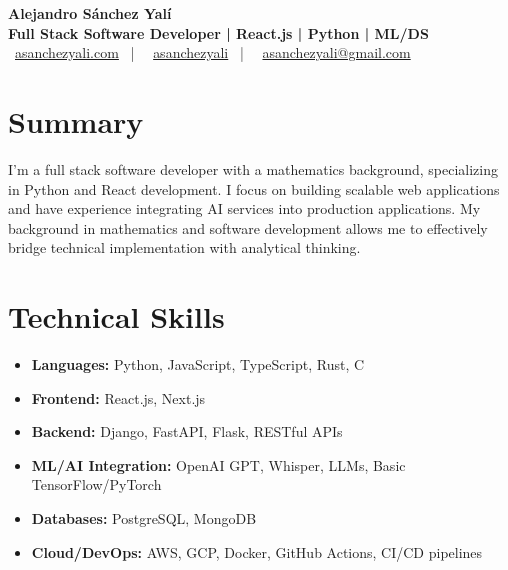 \documentclass[letterpaper,11pt]{article}
\begin{document}
\begin{center}
\textbf{\Huge Alejandro Sánchez Yalí}\\[0.3em]
\textbf{\Large Full Stack Software Developer | React.js | Python | ML/DS}\\[0.5em]
\small
\faGlobe\ \href{https://asanchezyali.com}{asanchezyali.com} ~|~
\faLinkedin\ \href{https://www.linkedin.com/in/asanchezyali}{asanchezyali} ~|~
\faEnvelope\ \href{mailto:asanchezyali@gmail.com}{asanchezyali@gmail.com}
\end{center}

\section{Summary}
I'm a full stack software developer with a mathematics background, specializing in Python and React development. I focus on building scalable web applications and have experience integrating AI services into production applications. My background in mathematics and software development allows me to effectively bridge technical implementation with analytical thinking.

\section{Technical Skills}
\begin{itemize}[leftmargin=*]
  \item \textbf{Languages:} Python, JavaScript, TypeScript, Rust, C
  \item \textbf{Frontend:} React.js, Next.js
  \item \textbf{Backend:} Django, FastAPI, Flask, RESTful APIs
  \item \textbf{ML/AI Integration:} OpenAI GPT, Whisper, LLMs, Basic TensorFlow/PyTorch
  \item \textbf{Databases:} PostgreSQL, MongoDB
  \item \textbf{Cloud/DevOps:} AWS, GCP, Docker, GitHub Actions, CI/CD pipelines
\end{itemize}
\end{document}
